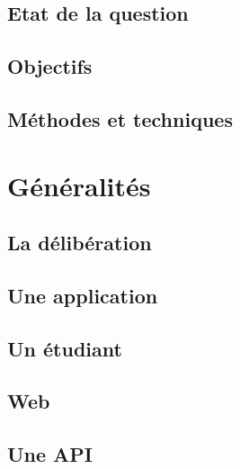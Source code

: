 \documentclass[12pt, a4paper]{report}
\begin{document}
    \section{Etat de la question}\label{sec:etat-de-l-art}
    

    \section{Objectifs}\label{sec:objectifs}
    

    \section{Méthodes et techniques}\label{sec:methode}
    

    \chapter{Généralités}\label{cha:generalites}

    \section{La délibération}\label{subsec:deliberation}
    

    \section{Une application}\label{subsec:application}
    

    \section{Un étudiant}\label{subsec:etudiants}
    

    \section{Web}\label{subsec:web}
    

    \section{Une API}\label{subsec:api}
    
\end{document}
